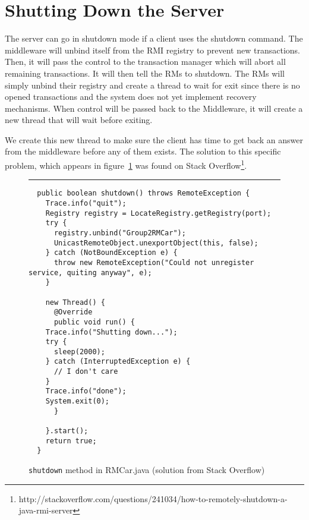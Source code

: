 \documentclass[12pt]{article}
\theoremstyle{plain}%
\theoremstyle{definition}
\theoremstyle{remark}
\newcommand{\java}[1]{{\lstinline!#1!}}
\newenvironment{figureone}[1]{%
  \def\deffigurecaption{#1}%
  \begin{figure}[htbp]%
  \begin{center}%
  \begin{minipage}{\columnwidth}%
  \hrule \vspace*{2ex}%
}{%
  \end{minipage}%
  \end{center}%
  \caption{\deffigurecaption}%
  \end{figure}%
}
\begin{document}
\section{Shutting Down the Server}

The server can go in shutdown mode if a client uses the shutdown command. The middleware will unbind itself from the RMI registry to prevent new transactions. Then, it will pass the control to the transaction manager which will abort all remaining transactions. It will then tell the RMs to shutdown. The RMs will simply unbind their registry and create a thread to wait for exit since there is no opened transactions and the system does not yet implement recovery mechanisms. When control will be passed back to the Middleware, it will create a new thread that will wait before exiting.

We create this new thread to make sure the client has time to get back an answer from the middleware before any of them exists. The solution to this specific problem, which appears in figure~\ref{fig:shutdown} was found on Stack Overflow\footnote{http://stackoverflow.com/questions/241034/how-to-remotely-shutdown-a-java-rmi-server}.

\begin{figureone}{\java{shutdown} method in RMCar.java (solution from Stack Overflow) \label{fig:shutdown}}
\begin{lstlisting}
  public boolean shutdown() throws RemoteException {
    Trace.info("quit");
    Registry registry = LocateRegistry.getRegistry(port);
    try {
      registry.unbind("Group2RMCar");
      UnicastRemoteObject.unexportObject(this, false);
    } catch (NotBoundException e) {
      throw new RemoteException("Could not unregister service, quiting anyway", e);
    }

    new Thread() {
      @Override
      public void run() {
	Trace.info("Shutting down...");
	try {
	  sleep(2000);
	} catch (InterruptedException e) {
	  // I don't care
	}
	Trace.info("done");
	System.exit(0);
      }

    }.start();
    return true;
  }
\end{lstlisting}
\end{figureone}




\end{document}
